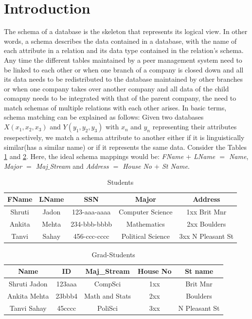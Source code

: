 \documentclass[conference]{IEEEtran}
\begin{document}
\section{Introduction}
The schema of a database is the skeleton that represents its logical view. In other words, a schema describes the data contained in a database, with the name of each attribute in a relation and its data type contained in the relation's schema. Any time the different tables maintained by a peer management system need to be linked to each other or when one branch of a company is closed down and all its data needs to be redistributed to the database maintained by other branches or when one company takes over another company and all data of the child comapny needs to be integrated with that of the parent company, the need to match schemas of multiple relations with each other arises. In basic terms, schema matching can be explained as follows: Given two databases
$X(x_1, x_2, x_3 )$ and $Y(y_1, y_2, y_3 )$ with $x_n$ and $y_n$ representing
their attributes resepectively, we match a schema attribute to another either if it is linguistically similar(has a similar name) or if it represents the same data. Consider the Tables \ref{students} and \ref{grad-students}. Here, the ideal schema mappings would be: \textit{FName $+$ LName $=$ Name}, \textit{Major $=$ Maj$\_$Stream} and \textit{Address $=$ House No $+$ St Name}.  

\begin{table}[h]
\centering
\caption{Students}
\begin{tabular}{|c|c|c|c|c|}
\hline
FName & LName & SSN & Major & Address\\
\hline \hline
Shruti & Jadon & 123-aaa-aaaa & Computer Science & 1xx Brit Mnr\\
Ankita & Mehta & 234-bbb-bbbb & Mathematics & 2xx Boulders\\
Tanvi & Sahay & 456-ccc-cccc & Political Science & 3xx N Pleasant St\\
\hline
\end{tabular}
\label{students}
\end{table}

\begin{table}[h]
\centering
\caption{Grad-Students}
\begin{tabular}{|c|c|c|c|c|}
\hline
Name & ID & Maj\_Stream & House No & St name\\
\hline \hline
Shruti Jadon & 123aaa & CompSci & 1xx & Brit Mnr\\
Ankita Mehta & 23bbb4 & Math and Stats & 2xx & Boulders\\
Tanvi Sahay & 45cccc & PoliSci & 3xx & N Pleasant St\\
\hline
\end{tabular}
\label{grad-students}
\end{table}
\end{document}
